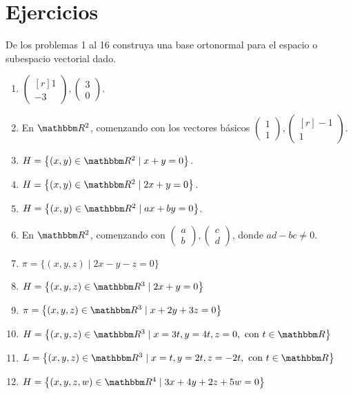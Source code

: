 \newpage

\section{Ejercicios}

\noindent De los problemas 1 al 16 construya una base ortonormal para el espacio o subespacio vectorial dado.
\begin{enumerate}
    \item $\begin{pmatrix*}[r]1 \\ -3\end{pmatrix*},\begin{pmatrix*}3 \\ 0\end{pmatrix*}$.
    \item En $\RR[2]$, comenzando con los vectores básicos $\begin{pmatrix*}1 \\ 1\end{pmatrix*},\begin{pmatrix*}[r]-1 \\ 1\end{pmatrix*}$.
    \item $H=\left\{(x, y) \in \RR[2] \mid x+y=0\right\}$.
    \item $H=\left\{(x, y) \in \RR[2] \mid 2 x+y=0\right\}$.
    \item $H=\left\{(x, y) \in \RR[2] \mid a x+b y=0\right\}$.
    \item En $\RR[2]$, comenzando con $\begin{pmatrix*}a \\ b\end{pmatrix*},\begin{pmatrix*}c \\ d\end{pmatrix*}$, donde $a d-b c \neq 0$.
    \item $\pi=\{(x, y, z) \mid 2 x-y-z=0\}$
    \item $H=\left\{(x, y, z) \in \RR[3] \mid 2 x+y=0\right\}$
    \item $\pi=\left\{(x, y, z) \in \RR[3] \mid x+2 y+3 z=0\right\}$
    \item $H=\left\{(x, y, z) \in \RR[3] \mid x=3 t, y=4 t, z=0, \text{ con }t \in \RR\right\}$
    \item $L=\left\{(x, y, z) \in \RR[3] \mid x=t, y=2 t, z=-2 t, \text{ con }t \in \RR\right\}$
    \item $H=\left\{(x, y, z, w) \in \RR[4] \mid 3 x+4 y+2 z+5 w=0\right\}$

\end{enumerate}
